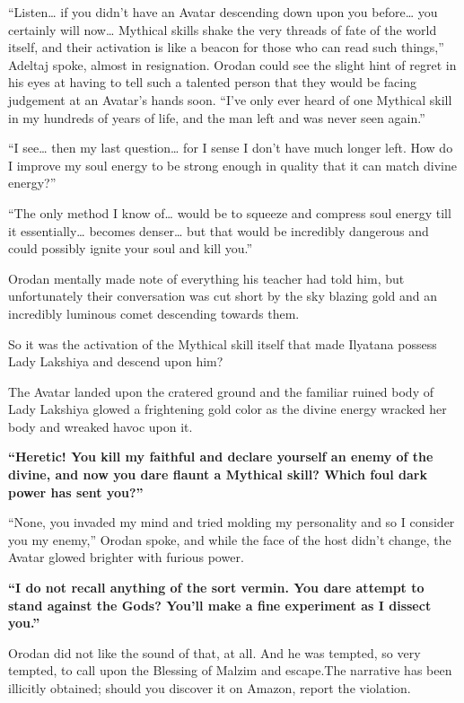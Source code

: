 \documentclass[a4paper,10pt]{book}
\begin{document}
“Listen… if you didn’t have an Avatar descending down upon you before… you certainly will now… Mythical skills shake the very threads of fate of the world itself, and their activation is like a beacon for those who can read such things,” Adeltaj spoke, almost in resignation. Orodan could see the slight hint of regret in his eyes at having to tell such a talented person that they would be facing judgement at an Avatar’s hands soon. “I’ve only ever heard of one Mythical skill in my hundreds of years of life, and the man left and was never seen again.”\par
“I see… then my last question… for I sense I don’t have much longer left. How do I improve my soul energy to be strong enough in quality that it can match divine energy?”\par
“The only method I know of… would be to squeeze and compress soul energy till it essentially… becomes denser… but that would be incredibly dangerous and could possibly ignite your soul and kill you.”\par
Orodan mentally made note of everything his teacher had told him, but unfortunately their conversation was cut short by the sky blazing gold and an incredibly luminous comet descending towards them.\par
So it was the activation of the Mythical skill itself that made Ilyatana possess Lady Lakshiya and descend upon him?\par
The Avatar landed upon the cratered ground and the familiar ruined body of Lady Lakshiya glowed a frightening gold color as the divine energy wracked her body and wreaked havoc upon it.\par
\textbf{“Heretic! You kill my faithful and declare yourself an enemy of the divine, and now you dare flaunt a Mythical skill? Which foul dark power has sent you?”}\par
“None, you invaded my mind and tried molding my personality and so I consider you my enemy,” Orodan spoke, and while the face of the host didn’t change, the Avatar glowed brighter with furious power.\par
\textbf{“I do not recall anything of the sort vermin. You dare attempt to stand against the Gods? You’ll make a fine experiment as I dissect you.”}\par
Orodan did not like the sound of that, at all. And he was tempted, so very tempted, to call upon the Blessing of Malzim and escape.The narrative has been illicitly obtained; should you discover it on Amazon, report the violation.\par
\end{document}
